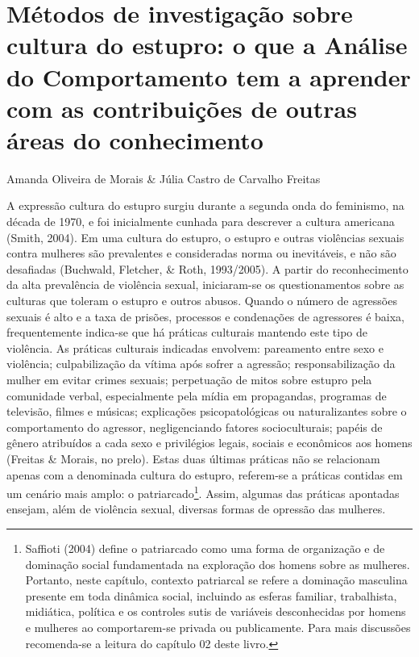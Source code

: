 \chapter{Métodos de investigação sobre cultura do estupro: o que a Análise do Comportamento tem a aprender com as contribuições de outras áreas do conhecimento}
\begin{flushright}
\begin{scriptsize}
    Amanda Oliveira de Morais \& Júlia Castro de Carvalho Freitas
\end{scriptsize}
\vspace{1cm}
\end{flushright}

A expressão cultura do estupro surgiu durante a segunda onda do feminismo, na década de 1970, e foi inicialmente cunhada para descrever a cultura americana (Smith, 2004). Em uma cultura do estupro, o estupro e outras violências sexuais contra mulheres são prevalentes e consideradas norma ou inevitáveis, e não são desafiadas (Buchwald, Fletcher, \& Roth, 1993/2005). A partir do reconhecimento da alta prevalência de violência sexual, iniciaram-se os questionamentos sobre as culturas que toleram o estupro e outros abusos. Quando o número de agressões sexuais é alto e a taxa de prisões, processos e condenações de agressores é baixa, frequentemente indica-se que há práticas culturais mantendo este tipo de violência. As práticas culturais indicadas envolvem: pareamento entre sexo e violência; culpabilização da vítima após sofrer a agressão; responsabilização da mulher em evitar crimes sexuais; perpetuação de mitos sobre estupro pela comunidade verbal, especialmente pela mídia em propagandas, programas de televisão, filmes e músicas; explicações psicopatológicas ou naturalizantes sobre o comportamento do agressor, negligenciando fatores socioculturais; papéis de gênero atribuídos a cada sexo e privilégios legais, sociais e econômicos aos homens (Freitas \& Morais, no prelo). Estas duas últimas práticas não se relacionam apenas com a denominada cultura do estupro, referem-se a práticas contidas em um cenário mais amplo: o patriarcado\footnote{Saffioti (2004) define o patriarcado como uma forma de organização e de dominação social fundamentada na exploração dos homens sobre as mulheres. Portanto, neste capítulo, contexto patriarcal se refere a dominação masculina presente em toda dinâmica social, incluindo as esferas familiar, trabalhista, midiática, política e os controles sutis de variáveis desconhecidas por homens e mulheres ao comportarem-se privada ou publicamente. 
Para mais discussões recomenda-se a leitura do capítulo 02 deste livro.}. Assim, algumas das práticas apontadas ensejam, além de violência sexual, diversas formas de opressão das mulheres.

